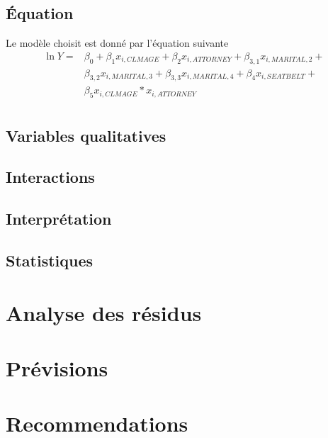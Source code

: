 \documentclass{article}\usepackage[]{graphicx}\usepackage[]{color}
\begin{document}
\subsection{Équation}
\label{ssec:equation}
Le modèle choisit est donné par l'équation suivante
$$
\begin{aligned}
\ln Y  = & \beta_0 + \beta_1x_{i,CLMAGE} + \beta_2x_{i,ATTORNEY} + \beta_{3,1}x_{i,MARITAL,2} + \\ 
& \beta_{3,2}x_{i,MARITAL,3} + \beta_{3,3}x_{i,MARITAL,4} + \beta_4x_{i,SEATBELT} + \\ 
& \beta_5x_{i,CLMAGE}*x_{i,ATTORNEY}\\
\end{aligned}
$$
\subsection{Variables qualitatives}
\label{ssec:var_qual}

\subsection{Interactions}
\label{ssec:interaction}

\subsection{Interprétation}
\label{ssec:interpretation}

\subsection{Statistiques}
\label{ssec:stats}

\section{Analyse des résidus}
\label{sec:analyse}

\section{Prévisions}
\label{sec:prev}

\section{Recommendations}
\end{document}
